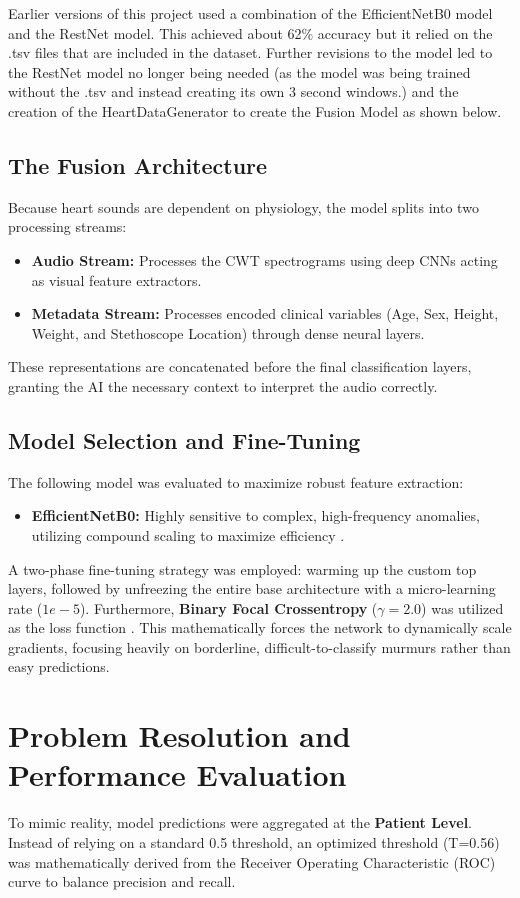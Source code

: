 \documentclass[11pt, a4paper]{article}
\begin{document}
Earlier versions of this project used a combination of the EfficientNetB0 model and the RestNet model. This achieved about 62\% accuracy but it relied on the .tsv files that are included in the dataset.
Further revisions to the model led to the RestNet model no longer being needed (as the model was being trained without the .tsv and instead creating its own 3 second windows.) and the creation of the HeartDataGenerator
to create the Fusion Model as shown below.

\subsection{The Fusion Architecture}
Because heart sounds are dependent on physiology, the model splits into two processing streams:
\begin{itemize}
    \item \textbf{Audio Stream:} Processes the CWT spectrograms using deep CNNs acting as visual feature extractors.
    \item \textbf{Metadata Stream:} Processes encoded clinical variables (Age, Sex, Height, Weight, and Stethoscope Location) through dense neural layers.
\end{itemize}
These representations are concatenated before the final classification layers, granting the AI the necessary context to interpret the audio correctly.

\subsection{Model Selection and Fine-Tuning}
The following model was evaluated to maximize robust feature extraction:
\begin{itemize}
    \item \textbf{EfficientNetB0:} Highly sensitive to complex, high-frequency anomalies, utilizing compound scaling to maximize efficiency \cite{tan2019efficientnet}.
\end{itemize}
A two-phase fine-tuning strategy was employed: warming up the custom top layers, followed by unfreezing the entire base architecture with a micro-learning rate ($1e-5$). Furthermore, \textbf{Binary Focal Crossentropy} ($\gamma=2.0$) was utilized as the loss function \cite{lin2017focal}. This mathematically forces the network to dynamically scale gradients, focusing heavily on borderline, difficult-to-classify murmurs rather than easy predictions.

\section{Problem Resolution and Performance Evaluation}
To mimic reality, model predictions were aggregated at the \textbf{Patient Level}. Instead of relying on a standard 0.5 threshold, an optimized threshold (T=0.56) was mathematically derived from the Receiver Operating Characteristic (ROC) curve to balance precision and recall.
\end{document}
